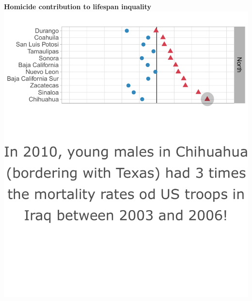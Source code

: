 \documentclass[xcolor={dvipsnames}]{beamer}
\begin{document}
\begin{frame}
	\begin{center}
		\Large{\textbf{Homicide contribution to lifespan inquality}}
		\includegraphics[scale=.47]{Figures/Figure_422}
	\end{center}

\end{frame}
\end{document}
